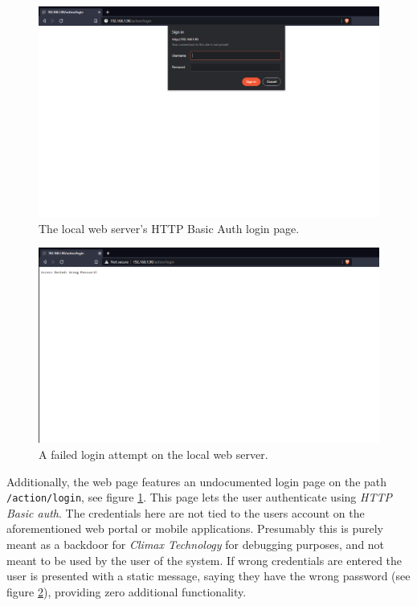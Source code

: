 \begin{figure}[!ht]
    \centering
    \includegraphics[width=\textwidth]{images/local-login-page.png}
    \caption{The local web server's HTTP Basic Auth login page.}
    \label{fig:local-login-page}
\end{figure}
\begin{figure}[!ht]
    \centering
    \includegraphics[width=\textwidth]{images/local-login-denied.png}
    \caption{A failed login attempt on the local web server.}
    \label{fig:local-login-denied}
\end{figure}
Additionally, the web page features an undocumented login page on the path \texttt{/action/login}, see figure \ref{fig:local-login-page}. This page lets the user authenticate using \textit{HTTP Basic auth}. The credentials here are not tied to the users account on the aforementioned web portal or mobile applications. Presumably this is purely meant as a backdoor for \textit{Climax Technology} for debugging purposes, and not meant to be used by the user of the system. If wrong credentials are entered the user is presented with a static message, saying they have the wrong password (see figure \ref{fig:local-login-denied}), providing zero additional functionality.